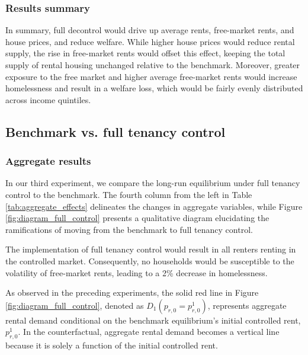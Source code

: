 \documentclass[parskip=full]{article}
\begin{document}
\subsubsection{Results summary}

In summary, full decontrol would drive up average rents, free-market rents, and house prices, and reduce welfare. While higher house prices would reduce rental supply, the rise in free-market rents would offset this effect, keeping the total supply of rental housing unchanged relative to the benchmark. Moreover, greater exposure to the free market and higher average free-market rents would increase homelessness and result in a welfare loss, which would be fairly evenly distributed across income quintiles.

\subsection{Benchmark vs. full tenancy control}\label{subsection:full_control}

\subsubsection{Aggregate results}

In our third experiment, we compare the long-run equilibrium under full tenancy control to the benchmark. The fourth column from the left in Table \ref{tab:aggregate_effects} delineates the changes in aggregate variables, while Figure \ref{fig:diagram_full_control} presents a qualitative diagram elucidating the ramifications of moving from the benchmark to full tenancy control.

The implementation of full tenancy control would result in all renters renting in the controlled market. Consequently, no households would be susceptible to the volatility of free-market rents, leading to a 2\% decrease in homelessness.

As observed in the preceding experiments, the solid red line in Figure \ref{fig:diagram_full_control}, denoted as $D_{1}(p_{r,0}=p^{1}_{r,0})$, represents aggregate rental demand conditional on the benchmark equilibrium's initial controlled rent, $p^{1}_{r,0}$. In the counterfactual, aggregate rental demand becomes a vertical line because it is solely a function of the initial controlled rent.
\end{document}
